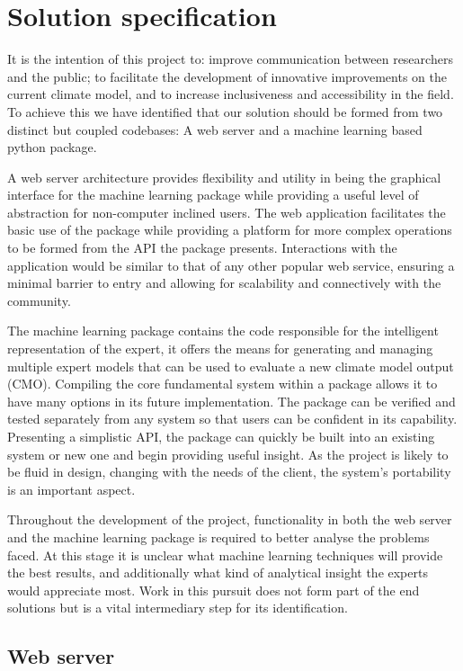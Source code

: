 \documentclass{ecmm427_assignment}
\begin{document}
\section{Solution specification}

 It is the intention of this project to: improve communication between researchers and the public; to facilitate the development of innovative improvements on the current climate model, and to increase inclusiveness and accessibility in the field. To achieve this we have identified that our solution should be formed from two distinct but coupled codebases: A web server and a machine learning based python package.

 A web server architecture provides flexibility and utility in being the graphical interface for the machine learning package while providing a useful level of abstraction for non-computer inclined users. The web application facilitates the basic use of the package while providing a platform for more complex operations to be formed from the API the package presents. Interactions with the application would be similar to that of any other popular web service, ensuring a minimal barrier to entry and allowing for scalability and connectively with the community.

 The machine learning package contains the code responsible for the intelligent representation of the expert, it offers the means for generating and managing multiple expert models that can be used to evaluate a new climate model output (CMO). Compiling the core fundamental system within a package allows it to have many options in its future implementation. The package can be verified and tested separately from any system so that users can be confident in its capability. Presenting a simplistic API, the package can quickly be built into an existing system or new one and begin providing useful insight. As the project is likely to be fluid in design, changing with the needs of the client, the system's portability is an important aspect.

 Throughout the development of the project, functionality in both the web server and the machine learning package is required to better analyse the problems faced. At this stage it is unclear what machine learning techniques will provide the best results, and additionally what kind of analytical insight the experts would appreciate most. Work in this pursuit does not form part of the end solutions but is a vital intermediary step for its identification.

\subsection{Web server}
\end{document}

